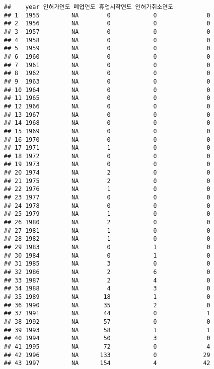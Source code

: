 \documentclass[
]{book}
\begin{document}
\begin{verbatim}
##    year 인허가연도 폐업연도 휴업시작연도 인허가취소연도
## 1  1955         NA        0            0              0
## 2  1956         NA        0            0              0
## 3  1957         NA        0            0              0
## 4  1958         NA        0            0              0
## 5  1959         NA        0            0              0
## 6  1960         NA        0            0              0
## 7  1961         NA        0            0              0
## 8  1962         NA        0            0              0
## 9  1963         NA        0            0              0
## 10 1964         NA        0            0              0
## 11 1965         NA        0            0              0
## 12 1966         NA        0            0              0
## 13 1967         NA        0            0              0
## 14 1968         NA        0            0              0
## 15 1969         NA        0            0              0
## 16 1970         NA        0            0              0
## 17 1971         NA        1            0              0
## 18 1972         NA        0            0              0
## 19 1973         NA        0            0              0
## 20 1974         NA        2            0              0
## 21 1975         NA        2            0              0
## 22 1976         NA        1            0              0
## 23 1977         NA        0            0              0
## 24 1978         NA        0            0              0
## 25 1979         NA        1            0              0
## 26 1980         NA        2            0              0
## 27 1981         NA        1            0              0
## 28 1982         NA        1            0              0
## 29 1983         NA        0            1              0
## 30 1984         NA        0            1              0
## 31 1985         NA        3            0              0
## 32 1986         NA        2            6              0
## 33 1987         NA        2            4              0
## 34 1988         NA        4            3              0
## 35 1989         NA       18            1              0
## 36 1990         NA       35            2              0
## 37 1991         NA       44            0              1
## 38 1992         NA       57            0              0
## 39 1993         NA       58            1              1
## 40 1994         NA       50            3              0
## 41 1995         NA       72            0              4
## 42 1996         NA      133            0             29
## 43 1997         NA      154            4             42

\end{verbatim}
\end{document}
